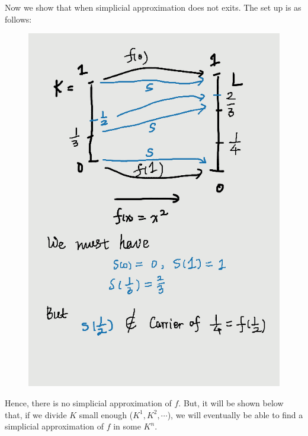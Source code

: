 \begin{ex}
    Now we show that when simplicial approximation does not exits. The
    set up is as follows:
    \begin{figure}[H]
        \centering
        \includegraphics[width=0.8\linewidth]{pics/ch6-notes-2/ex4.png}
    \end{figure}
    Hence, there is no simplicial approximation of $f$. But, it will
    be shown below that, if we divide $K$ small enough
    ($K^1,K^2,\cdots$), we will eventually be able to find a
    simplicial approximation of $f$ in some $K^n$.
\end{ex}

